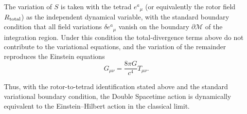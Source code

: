 \documentclass[dvipdfmx,a4paper]{article}
\begin{document}
The variation of $S$ is taken with the tetrad $e^a{}_\mu$ (or equivalently the rotor field $R_{\rm total}$) as the independent dynamical variable, with the standard boundary condition that all field variations $\delta e^a{}_\mu$ vanish on the boundary $\partial\mathcal{M}$ of the integration region. Under this condition the total-divergence terms above do not contribute to the variational equations, and the variation of the remainder reproduces the Einstein equations
\[
G_{\mu\nu} = \frac{8\pi G}{c^4} T_{\mu\nu}.
\]

Thus, with the rotor-to-tetrad identification stated above and the standard variational boundary condition, the Double Spacetime action is dynamically equivalent to the Einstein--Hilbert action in the classical limit.
\end{document}
